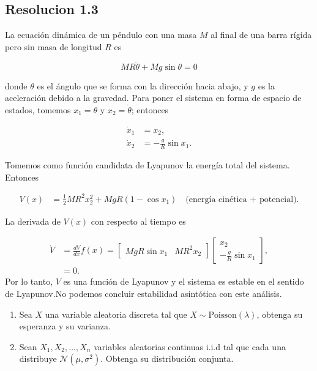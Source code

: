 \documentclass[
  11pt,
  letterpaper,
   addpoints,
   answers
  ]{exam}
\begin{document}
\begin{questions}
\begin{solution}
\subsection*{Resolucion 1.3}
La ecuación dinámica de un péndulo con una masa \( M \) al final de una barra rígida pero sin masa de longitud \( R \) es

\[
    MR\ddot{\theta} + Mg \sin \theta = 0
\]

donde \( \theta \) es el ángulo que se forma con la dirección hacia abajo, y \( g \) es la aceleración debido a la gravedad. Para poner el sistema en forma de espacio de estados, tomemos \( x_1 = \theta \) y \( x_2 = \dot{\theta} \); entonces

\begin{align}
    \dot{x}_1 &= x_2, \\
    \dot{x}_2 &= -\frac{g}{R} \sin x_1.
\end{align}

Tomemos como función candidata de Lyapunov la energía total del sistema. Entonces

\begin{align}
    V(x) &= \frac{1}{2} MR^2 x_2^2 + MgR (1 - \cos x_1) \quad \text{(energía cinética + potencial)}.
\end{align}

La derivada de \( V(x) \) con respecto al tiempo es

\begin{align}
    \dot{V} &= \frac{dV}{dx} f(x) = \begin{bmatrix} MgR \sin x_1 & MR^2 x_2 \end{bmatrix} \begin{bmatrix} x_2 \\ -\frac{g}{R} \sin x_1 \end{bmatrix}, \\
    &= 0.
\end{align}
Por lo tanto, \( V \) es una función de Lyapunov y el sistema es estable en el sentido de Lyapunov.No podemos concluir estabilidad asintótica con este análisis.


\end{solution}
\question 
    \begin{enumerate}
    \item Sea \( X \) una variable aleatoria discreta tal que \( X \sim \text{Poisson}(\lambda) \), obtenga su esperanza y su varianza.
    
    \item Sean \( X_1, X_2, \dots, X_n \) variables aleatorias continuas i.i.d tal que cada una distribuye \( \mathcal{N}(\mu, \sigma^2) \). Obtenga su distribución conjunta.
    

\end{enumerate}
\end{questions}
\end{document}
